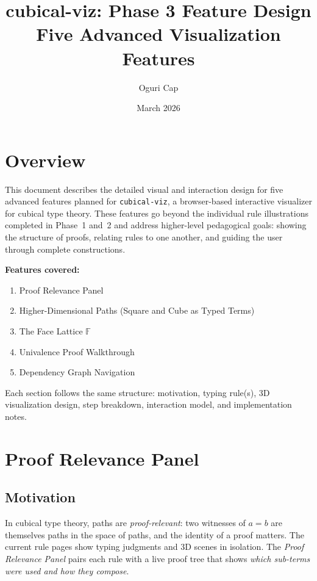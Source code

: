 \documentclass[11pt,a4paper]{article}
\title{\textbf{cubical-viz: Phase 3 Feature Design}\\
\large Five Advanced Visualization Features}
\author{Oguri Cap}
\date{March 2026}
\begin{document}
\maketitle
\tableofcontents
\newpage

\section{Overview}

This document describes the detailed visual and interaction design for five
advanced features planned for \texttt{cubical-viz}, a browser-based interactive
visualizer for cubical type theory. These features go beyond the individual rule
illustrations completed in Phase~1 and~2 and address higher-level pedagogical
goals: showing the structure of proofs, relating rules to one another, and
guiding the user through complete constructions.

\medskip
\noindent\textbf{Features covered:}
\begin{enumerate}
  \item Proof Relevance Panel
  \item Higher-Dimensional Paths (Square and Cube as Typed Terms)
  \item The Face Lattice $\mathbb{F}$
  \item Univalence Proof Walkthrough
  \item Dependency Graph Navigation
\end{enumerate}

\medskip
\noindent Each section follows the same structure: motivation, typing rule(s),
3D visualization design, step breakdown, interaction model, and implementation
notes.

\section{Proof Relevance Panel}

\subsection{Motivation}

In cubical type theory, paths are \emph{proof-relevant}: two witnesses of
$a = b$ are themselves paths in the space of paths, and the identity of a proof
matters. The current rule pages show typing judgments and 3D scenes in
isolation. The \emph{Proof Relevance Panel} pairs each rule with a live proof
tree that shows \emph{which sub-terms were used and how they compose}.
\end{document}
